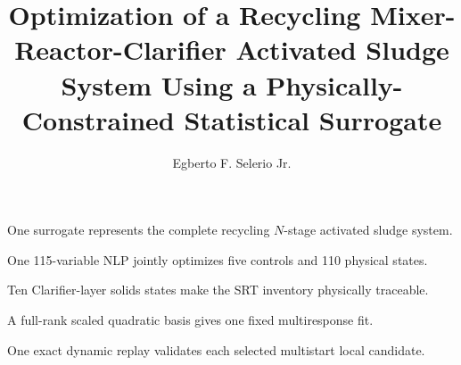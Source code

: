 \documentclass[a4paper,fleqn]{cas-sc}
\begin{document}
\title[mode=title]{Optimization of a Recycling Mixer-Reactor-Clarifier Activated Sludge System Using a Physically-Constrained Statistical Surrogate}
\author[1]{Egberto F. Selerio Jr.}

\begin{highlights}
\item One surrogate represents the complete recycling $N$-stage activated sludge system.
\item One 115-variable NLP jointly optimizes five controls and 110 physical states.
\item Ten Clarifier-layer solids states make the SRT inventory physically traceable.
\item A full-rank scaled quadratic basis gives one fixed multiresponse fit.
\item One exact dynamic replay validates each selected multistart local candidate.
\end{highlights}

\maketitle
\end{document}
